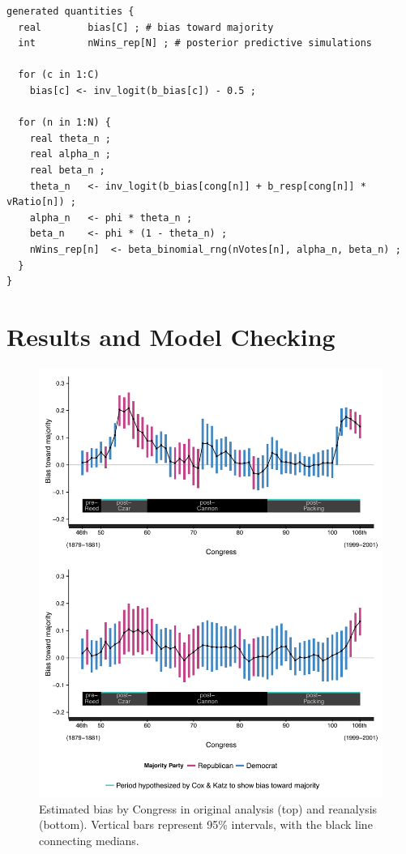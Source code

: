 \begin{singlespacing}
\small
\begin{verbatim}
generated quantities {
  real        bias[C] ; # bias toward majority
  int         nWins_rep[N] ; # posterior predictive simulations

  for (c in 1:C)
    bias[c] <- inv_logit(b_bias[c]) - 0.5 ;

  for (n in 1:N) {
    real theta_n ; 
    real alpha_n ;
    real beta_n ;
    theta_n   <- inv_logit(b_bias[cong[n]] + b_resp[cong[n]] * vRatio[n]) ;
    alpha_n   <- phi * theta_n ;
    beta_n    <- phi * (1 - theta_n) ;
    nWins_rep[n]  <- beta_binomial_rng(nVotes[n], alpha_n, beta_n) ;
  }
}
\end{verbatim}
\end{singlespacing}


\section{Results and Model Checking}


\begin{figure}
\centering
\includegraphics[scale=0.75]{sections/figs/ck_replication}
\caption{Estimated bias by Congress in original analysis (top) and reanalysis (bottom). Vertical bars represent 95\%  intervals, with the black line connecting medians.}
\label{fig:ck_bias}
\end{figure}


